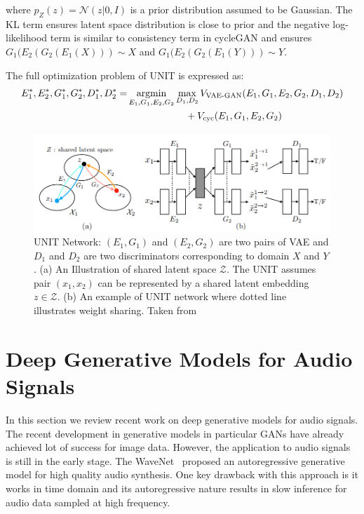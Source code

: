 where $p_Z(z)=\mathcal{N}(z|0,I)$ is a prior distribution assumed to be Gaussian. The KL term ensures latent space distribution is close to prior and the negative log-likelihood term is similar to consistency term in cycleGAN and ensures $G_1(E_2(G_2(E_1(X)))\sim X$ and $G_1(E_2(G_2(E_1(Y)))\sim Y$. 

The full optimization problem of UNIT is expressed as:
\begin{equation}
    \begin{aligned}
        E_1^\ast, E_2^\ast, G_1^\ast, G_2^\ast, D_1^\ast, D_2^\ast =& \operatorname*{argmin}_{E_1,G_1,E_2,G_2} \max_{D_1, D_2} V_\text{VAE-GAN} (E_1,G_1,E_2,G_2,D_1,D_2)\\
        &\qquad \qquad \qquad +  V_\text{cyc}(E_1,G_1,E_2,G_2)
    \end{aligned}
\end{equation}

\begin{figure}
    \centering
    \includegraphics[width=0.95\columnwidth]{master_thesis_template/figs/unit.PNG}
    \caption{UNIT Network:  $(E_1,G_1)$ and $(E_2,G_2)$ are two pairs of VAE and $D_1$ and $D_2$ are two discriminators corresponding to domain $X$ and $Y$. (a) An Illustration of shared latent space $\mathcal{Z}$. The UNIT assumes pair $(x_1,x_2)$ can be represented by a shared latent embedding $z\in\mathcal{Z}$. (b) An example of UNIT network where dotted line illustrates weight sharing. Taken from~\cite{liu2017unsupervised}}
    \label{fig:vae-gan}
\end{figure}



\section{Deep Generative Models for Audio Signals}
\label{subsec:dganaudio}
In this section we review recent work on deep generative models for audio signals. The recent development in generative models in particular GANs have already achieved lot of success for image data. However, the application to audio signals is still in the early stage. The WaveNet~\cite{oord2016wavenet} proposed an autoregressive generative model for high quality audio synthesis. One key drawback with this approach is it works in time domain and its autoregressive nature results in slow inference for audio data sampled at high frequency. 

